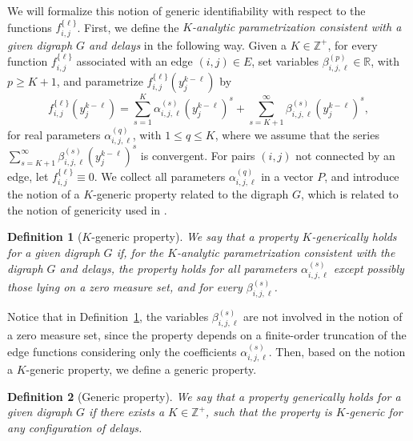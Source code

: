 \documentclass[letterpaper,10pt,journal]{IEEEtran}
\newtheorem{definition}{Definition}
\newcommand{\R}{\mathbb R}
\begin{document}
We will formalize this notion of generic identifiability with respect to the functions $f_{i,j}^{\{\ell\}}$. First, we define the \emph{$K$-analytic parametrization consistent with a given digraph $G$ and delays} in the following way. Given a $K\in\mathbb{Z}^+$, for every function $f_{i,j}^{\{\ell\}}$ associated with an edge $(i,j)\in E$, set variables $\beta_{i,j,\ell}^{(p)}\in\R$, with $p\ge K+1$, and parametrize $f_{i,j}^{\{\ell\}}(y_j^{k-\ell})$ by
\begin{equation}\label{eq:parameterization}
f_{i,j}^{\{\ell\}}(y_j^{k-\ell})=\sum_{s=1}^K \alpha_{i,j,\ell}^{(s)}(y_j^{k-\ell})^{s}+\sum_{s=K+1}^\infty \beta_{i,j,\ell}^{(s)}(y_j^{k-\ell})^s,    
\end{equation}
for real parameters $\alpha_{i,j,\ell}^{(q)}$, with $1\le q\le K$, where we assume that the series $\sum_{s=K+1}^\infty \beta_{i,j,\ell}^{(s)}(y_j^{k-\ell})^{s}$ is convergent. For pairs $(i,j)$ not connected by an edge, let $f_{i,j}^{\{\ell\}}\equiv0$. We collect all parameters $\alpha_{i,j,\ell}^{(q)}$ in a vector $P$, and introduce the notion of a $K$-generic property related to the digraph $G$, which is related to the notion of genericity used in \cite{vanelli2025local}.
\begin{definition}[$K$-generic property]\label{def:K_generic_prop}
    We say that a property $K$-\emph{generically} holds for a given digraph $G$ if, for the $K$-analytic parametrization  consistent with the digraph $G$ and delays, the property holds for all parameters $\alpha_{i,j,\ell}^{(s)}$ except possibly those lying on a zero measure set, and for every $\beta_{i,j,\ell}^{(s)}$.
\end{definition}
Notice that in Definition~\ref{def:K_generic_prop}, the variables $\beta_{i,j,\ell}^{(s)}$ are not involved in the notion of a zero measure set, since the property depends on a finite-order truncation of the edge functions considering only the coefficients $\alpha_{i,j,\ell}^{(s)}$. Then, based on the notion a $K$-generic property, we define a generic property. 

\begin{definition}[Generic property]\label{def:generic_prop}
    We say that a property \emph{generically} holds for a given digraph $G$ if there exists a $K\in\mathbb{Z}^+$, such that the property is $K$-generic for any configuration of delays.
\end{definition}
\end{document}
